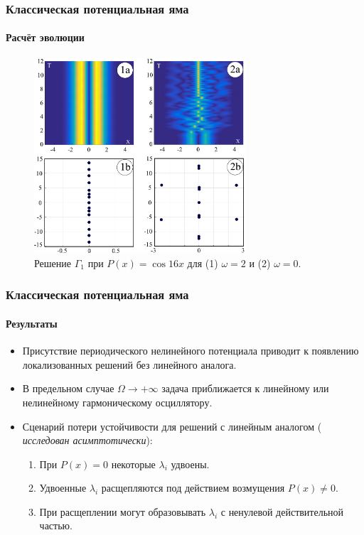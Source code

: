 \documentclass [10pt] {beamer}
\begin{document}

\begin{frame}
	\frametitle{Классическая потенциальная яма}
	\framesubtitle{Расчёт эволюции}
	
	\begin{figure}
		\includegraphics[width=0.7\textwidth]{pic/evolution.pdf}
		\caption{Решение $\Gamma_1$ при $P(x) = \cos 16 x$ для {\color{ceruleanblue} (1)} $\omega = 2$ и {\color{ceruleanblue} (2)} $\omega = 0$.}
		\label{pic:evolution}
	\end{figure}
\end{frame}

\begin{frame}
	\frametitle{Классическая потенциальная яма}
	\framesubtitle{Результаты\footnotemark[7]}
	
	\begin{itemize}
		\item Присутствие периодического нелинейного потенциала приводит к появлению локализованных решений без линейного аналога.
		\item В предельном случае $\Omega \to +\infty$ задача приближается к линейному или нелинейному гармоническому осциллятору.
		\item Сценарий потери устойчивости для решений с линейным аналогом ({\it {\color{ceruleanblue} исследован асимптотически}}):
		\begin{enumerate}
			\item При $P(x) = 0$ некоторые $\lambda_i$ удвоены.
			\item Удвоенные $\lambda_i$ расщепляются под действием возмущения $P(x) \neq 0$.
			\item При расщеплении могут образовывать $\lambda_i$ с ненулевой действительной частью.
		\end{enumerate}
	\end{itemize}
	
\end{frame}
\end{document}
